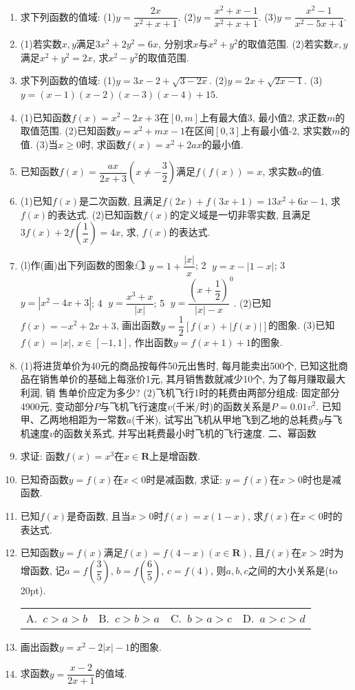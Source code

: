\documentclass[10pt,a4paper]{article}
\newcommand{\bracket}[1]{(\hbox to #1pt{})}
\newcommand{\fourch}[4]{\par\begin{tabular}{p{.23\textwidth}p{.23\textwidth}p{.23\textwidth}p{.23\textwidth}}
A.~#1 &B.~#2& C.~#3& D.~#4
\end{tabular}}
\begin{document}
\begin{enumerate}[1.]
\item 求下列函数的值域:
(1)$y=\dfrac{2x}{x^2+x+1}$.			(2)$y=\dfrac{x^2+x-1}{x^2+x+1}$.		(3)$y=\dfrac{x^2-1}{x^2-5x+4}$.
\item (1)若实数$x,y$满足$3x^2+2y^2=6x$, 分别求$x$与$x^2+y^2$的取值范围.
    (2)若实数$x,y$满足$x^2+y^2=2x$, 求$x^2-y^2$的取值范围.
\item 求下列函数的值域:
(1)$y=3x-2+\sqrt {3-2x}$.
(2)$y=2x+\sqrt {2x-1}$.
(3)$y=(x-1)(x-2)(x-3)(x-4)+15$.
\item (1)已知函数$f(x)=x^2-2x+3$在$[ 0,m ]$上有最大值3, 最小值2, 求正数$m$的取值范围.
    (2)已知函数$y=x^2+mx-1$在区间$[ 0,3 ]$上有最小值-2, 求实数$m$的值.
    (3)当$x\ge 0$时, 求函数$f(x)=x^2+2ax$的最小值.
\item 已知函数$f(x)=\dfrac{ax}{2x+3}(x\ne -\dfrac 32)$满足$f(f(x))=x$, 求实数$a$的值.
\item (1)已知$f(x)$是二次函数, 且满足$f(2x)+f(3x+1)=13x^2+6x-1$, 求$f(x)$的表达式.
    (2)已知函数$f(x)$的定义域是一切非零实数, 且满足$3f(x)+2f(\dfrac 1x)=4x$, 求, $f(x)$的表达式.
\item (l)作(画)出下列函数的图象:
\textcircled{1} $y=1+\dfrac{|x|}x$; \textcircled{2} $y=x-|1-x|$; \textcircled{3} $y=|x^2-4x+3|$; \textcircled{4} $y=\dfrac{x^3+x}{|x|}$; \textcircled{5} $y=\dfrac{(x+\dfrac 12)}{|x|-x}^0$.
(2)已知$f(x)=-x^2+2x+3$, 画出函数$y=\dfrac 12[ f(x)+|f(x)|]$的图象.
(3)已知$f(x)=|x|$, $x\in [ -1,1 ]$, 作出函数$y=f(x+1)+1$的图象.
\item (1)将进货单价为40元的商品按每件50元出售时, 每月能卖出500个, 已知这批商品在销售单价的基础上每涨价1元, 其月销售数就减少10个, 为了每月赚取最大利润, 销
售单价应定为多少?
(2)飞机飞行1时的耗费由两部分组成: 固定部分4900元, 变动部分$P$与飞机飞行速度$v$(千米/时)的函数关系是$P=0.01v^2$. 已知甲、乙两地相距为一常数$a$(千米), 试写出飞机从甲地飞到乙地的总耗费$y$与飞机速度$v$的函数关系式, 并写出耗费最小时飞机的飞行速度.
二、幂函数
\item 求证: 函数$f(x)=x^3$在$x\in \mathbf{R}$上是增函数.
\item 已知奇函数$y=f(x)$在$x<0$时是减函数, 求证: $y=f(x)$在$x>0$时也是减函数.
\item 已知$f(x)$是奇函数, 且当$x>0$时$f(x)=x(1-x)$, 求$f(x)$在$x<0$时的表达式.
\item 已知函数$y=f(x)$满足$f(x)=f(4-x)(x\in \mathbf{R})$, 且$f(x)$在$x>2$时为增函数, 记$a=f(\dfrac 35)$, $b=f(\dfrac 65)$, $c=f(4)$, 则$a,b,c$之间的大小关系是\bracket{20}.
\fourch{$c>a>b$}{$c>b>a$}{$b>a>c$}{$a>c>d$}
\item 画出函数$y=x^2-2|x|-1$的图象.
\item 求函数$y=\dfrac{x-2}{2x+1}$的值域.

\end{enumerate}
\end{document}
